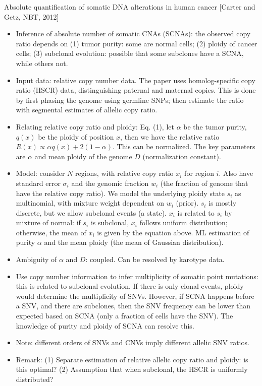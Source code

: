 \documentclass{report}
\begin{document}
Absolute quantification of somatic DNA alterations in human cancer [Carter and Getz, NBT, 2012]
\begin{itemize}
	
	\item Inference of absolute number of somatic CNAs (SCNAs): the observed copy ratio depends on (1) tumor purity: some are normal cells; (2) ploidy of cancer cells; (3) subclonal evolution: possible that some subclones have a SCNA, while others not. 
	
	\item Input data: relative copy number data. The paper uses homolog-specific copy ratio (HSCR) data, distinguishing paternal and maternal copies. This is done by first phasing the genome using germline SNPs; then estimate the ratio with segmental estimates of allelic copy ratio. 
	
	\item Relating relative copy ratio and ploidy: Eq. (1), let $\alpha$ be the tumor purity, $q(x)$ be the ploidy of position $x$, then we have the relative ratio $R(x) \propto \alpha q(x) + 2 (1-\alpha)$. This can be normalized. The key parameters are $\alpha$ and mean ploidy of the genome $D$ (normalization constant). 
	
	\item Model: consider $N$ regions, with relative copy ratio $x_i$ for region $i$. Also have standard error $\sigma_i$ and the genomic fraction $w_i$ (the fraction of genome that have the relative copy ratio). We model the underlying ploidy state $s_i$ as multinomial, with mixture weight dependent on $w_i$ (prior). $s_i$ is mostly discrete, but we allow subclonal events (a state). $x_i$ is related to $s_i$ by mixture of normal: if $s_i$ is subclonal, $x_i$ follows uniform distribution; otherwise, the mean of $x_i$ is given by the equation above. ML estimation of purity $\alpha$ and the mean ploidy (the mean of Gaussian distribution). 
	
	\item Ambiguity of $\alpha$ and $D$: coupled. Can be resolved by karotype data. 
	
	\item Use copy number information to infer multiplicity of somatic point mutations: this is related to subclonal evolution. If there is only clonal events, ploidy would determine the multiplicity of SNVs. However, if SCNA happens before a SNV, and there are subclones, then the SNV frequency can be lower than expected based on SCNA (only a fraction of cells have the SNV). The knowledge of purity and ploidy of SCNA can resolve this. 
	
	\item Note: different orders of SNVs and CNVs imply different allelic SNV ratios. 
	
	\item Remark: (1) Separate estimation of relative allelic copy ratio and ploidy: is this optimal? (2) Assumption that when subclonal, the HSCR is uniformly distributed? 
\end{itemize}
\end{document}
